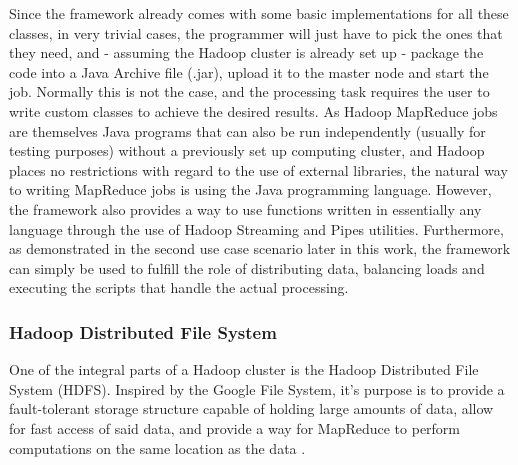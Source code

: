 \documentclass [12pt,a4paper]{report}
\begin{document}
Since the framework already comes with some basic implementations for all these classes, in very trivial cases, the programmer will just have to pick the ones that they need, and - assuming the Hadoop cluster is already set up - package the code into a Java Archive file (.jar), upload it to the master node and start the job. Normally this is not the case, and the processing task requires the user to write custom classes to achieve the desired results. As Hadoop MapReduce jobs are themselves Java programs that can also be run independently (usually for testing purposes) without a previously set up computing cluster, and Hadoop places no restrictions with regard to the use of external libraries, the natural way to writing MapReduce jobs is using the Java programming language. However, the framework also provides a way to use functions written in essentially any language through the use of Hadoop Streaming and Pipes utilities. Furthermore, as demonstrated in the second use case scenario later in this work, the framework can simply be used to fulfill the role of distributing data, balancing loads and executing the scripts that handle the actual processing.

\subsubsection{Hadoop Distributed File System}

One of the integral parts of a Hadoop cluster is the Hadoop Distributed File System (HDFS). Inspired by the Google File System, it's purpose is to provide a fault-tolerant storage structure capable of holding large amounts of data, allow for fast access of said data, and provide a way for MapReduce to perform computations on the same location as the data \cite{ghemawat2003google,borthakur2007hadoop}. 
\end{document}
